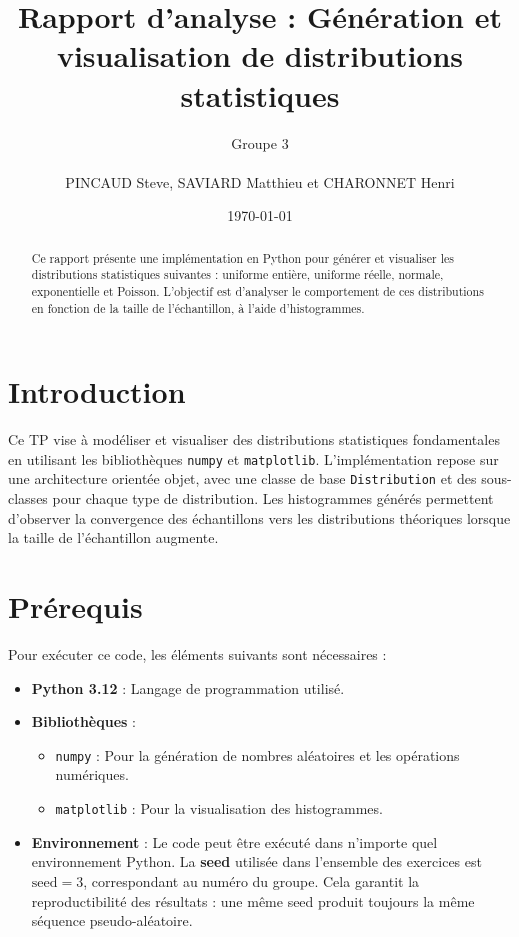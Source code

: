 \documentclass{article}
\title{Rapport d'analyse : Génération et visualisation de distributions statistiques}
\author{Groupe 3 \\ \\ PINCAUD Steve, SAVIARD Matthieu et CHARONNET Henri}
\date{\today}
\begin{document}
\maketitle

\begin{abstract}
Ce rapport présente une implémentation en Python pour générer et visualiser les distributions statistiques suivantes : uniforme entière, uniforme réelle, normale, exponentielle et Poisson. L'objectif est d'analyser le comportement de ces distributions en fonction de la taille de l'échantillon, à l'aide d'histogrammes.
\end{abstract}

\tableofcontents

\section{Introduction}
\sloppy
Ce TP vise à modéliser et visualiser des distributions statistiques fondamentales en utilisant les bibliothèques \texttt{numpy} et \texttt{matplotlib}. L'implémentation repose sur une architecture orientée objet, avec une classe de base \texttt{Distribution} et des sous-classes pour chaque type de distribution. Les histogrammes générés permettent d'observer la convergence des échantillons vers les distributions théoriques lorsque la taille de l'échantillon augmente.

\section{Prérequis}
Pour exécuter ce code, les éléments suivants sont nécessaires :
\begin{itemize}[leftmargin=*]
    \item \textbf{Python 3.12} : Langage de programmation utilisé.
    \item \textbf{Bibliothèques} :
    \begin{itemize}[leftmargin=*]
        \item \texttt{numpy} : Pour la génération de nombres aléatoires et les opérations numériques.
        \item \texttt{matplotlib} : Pour la visualisation des histogrammes.
    \end{itemize}
    \item \textbf{Environnement} : Le code peut être exécuté dans n'importe quel environnement Python.
    La \textbf{seed} utilisée dans l'ensemble des exercices est $\text{seed} = 3$,
    correspondant au numéro du groupe. Cela garantit la reproductibilité des résultats :
    une même seed produit toujours la même séquence pseudo-aléatoire.
\end{itemize}
\end{document}
